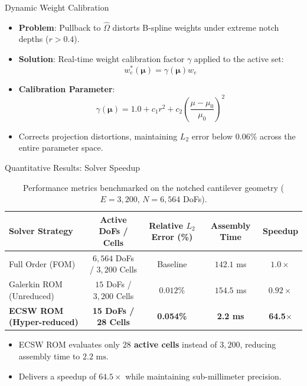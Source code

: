 \begin{frame}{Dynamic Weight Calibration}
    \begin{itemize}
        \item \textbf{Problem}: Pullback to $\hat{\Omega}$ distorts B-spline weights under extreme notch depths ($r > 0.4$).
        \item \textbf{Solution}: Real-time weight calibration factor $\gamma$ applied to the active set:
        \begin{equation*}
            w_e^*(\boldsymbol{\mu}) = \gamma(\boldsymbol{\mu}) w_e
        \end{equation*}
        \item \textbf{Calibration Parameter}:
        \begin{equation*}
            \gamma(\boldsymbol{\mu}) = 1.0 + c_1 r^2 + c_2 \left(\frac{\mu - \mu_0}{\mu_0}\right)^2
        \end{equation*}
        \item Corrects projection distortions, maintaining $L_2$ error below $0.06\%$ across the entire parameter space.
    \end{itemize}
\end{frame}

\begin{frame}{Quantitative Results: Solver Speedup}
    \begin{table}
        \centering
        \caption{Performance metrics benchmarked on the notched cantilever geometry ($E = 3,200$, $N = 6,564$ DoFs).}
        \label{tab:performance_results_extended}
        \begin{tabular}{lcccc}
            \toprule
            \textbf{Solver Strategy} & \textbf{Active DoFs / Cells} & \textbf{Relative $L_2$ Error (\%)} & \textbf{Assembly Time} & \textbf{Speedup} \\
            \midrule
            Full Order (FOM)        & $6,564$ DoFs / $3,200$ Cells & Baseline & $142.1$ ms & $1.0\times$ \\
            Galerkin ROM (Unreduced)& $15$ DoFs / $3,200$ Cells    & $0.012\%$   & $154.5$ ms & $0.92\times$ \\
            \textbf{ECSW ROM (Hyper-reduced)}& \textbf{15 DoFs / 28 Cells}  & \textbf{0.054\%} & \textbf{2.2 ms} & \textbf{64.5$\times$} \\
            \bottomrule
        \end{tabular}
    \end{table}
    \begin{itemize}
        \item ECSW ROM evaluates only \textbf{$28$ active cells} instead of $3,200$, reducing assembly time to \textbf{$2.2\text{ ms}$}.
        \item Delivers a speedup of \textbf{$64.5\times$} while maintaining sub-millimeter precision.
    \end{itemize}
\end{frame}

